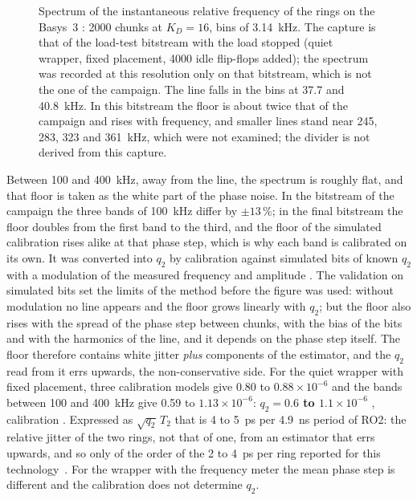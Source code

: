 \begin{figure}[htbp]
\caption{Spectrum of the instantaneous relative frequency of the rings
on the Basys~3 \meas{}: 2000 chunks at $K_D = 16$, bins of 3.14~kHz. The
capture is that of the load-test bitstream with the load stopped (quiet
wrapper, fixed placement, 4000 idle flip-flops added); the spectrum was
recorded at this resolution only on that bitstream, which is not the one
of the campaign. The
line falls in the bins at 37.7 and 40.8~kHz. In this bitstream the floor
is about twice that of the campaign and rises with frequency, and smaller
lines stand near 245, 283, 323 and 361~kHz, which were not examined; the
divider is not derived from this capture.}
\label{fig:fpga_spectrum}
\end{figure}

Between 100 and 400~kHz, away from the line, the spectrum is roughly
flat, and that floor is taken as the white part of the phase noise. In
the bitstream of the campaign the three bands of 100~kHz differ by
$\pm13$\,\%; in the final bitstream the floor doubles from the first band
to the third, and the floor of the simulated calibration rises alike at
that phase step, which is why each band is calibrated on its own.
It was converted into $q_2$ by calibration
against simulated bits of known $q_2$ with a modulation of the measured
frequency and amplitude \simu{}. The validation on simulated bits set the
limits of the method before the figure was used: without modulation no
line appears and the floor grows linearly with $q_2$; but the floor also
rises with the spread of the phase step between chunks, with the bias of
the bits and with the harmonics of the line, and it depends on the phase
step itself. The floor therefore contains white jitter \emph{plus}
components of the estimator, and the $q_2$ read from it errs upwards,
the non-conservative side. For the quiet wrapper with fixed placement,
three calibration models give 0.80 to $0.88\times10^{-6}$ and the bands
between 100 and 400~kHz give 0.59 to $1.13\times10^{-6}$: \textbf{$q_2 =
0.6$ to $1.1\times10^{-6}$} \meas{}, calibration \simu{}. Expressed as
$\sqrt{q_2}\,T_2$ that is 4 to 5~ps per 4.9~ns period of RO2: the
relative jitter of the two rings, not that of one, from an estimator
that errs upwards, and so only of the order of the 2 to 4~ps per ring
reported for this technology~\cite{petura_2016_survey}. For the
wrapper with the frequency meter the mean phase step is different and the
calibration does not determine $q_2$.

